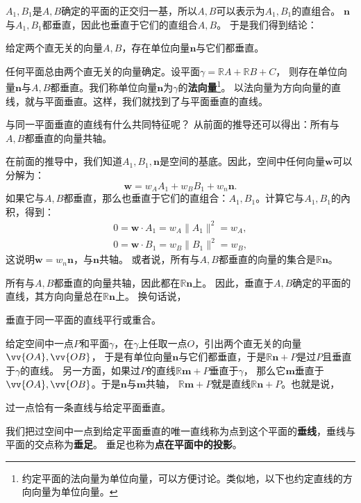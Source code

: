 \documentclass[12pt,UTF8,fontset=none]{ctexbook}
\begin{document}
$A_1,B_1$是$A,B$确定的平面的正交归一基，所以$A,B$可以表示为$A_1,B_1$的直组合。
$\mathbf{n}$与$A_1,B_1$都垂直，因此也垂直于它们的直组合$A,B$。
于是我们得到结论：
\begin{tm}\label{tm:1-3-30}
    给定两个直无关的向量$A,B$，存在单位向量$\mathbf{n}$与它们都垂直。
\end{tm}
任何平面总由两个直无关的向量确定。设平面$\gamma = \mathbb{R}A + \mathbb{R}B + C$，
则存在单位向量$\mathbf{n}$与$A,B$都垂直。我们称单位向量$\mathbf{n}$为$\gamma$的\textbf{法向量}\footnote{约定平面的法向量为单位向量，可以方便讨论。类似地，以下也约定直线的方向向量为单位向量。}。
以法向量为方向向量的直线，就与平面垂直。这样，我们就找到了与平面垂直的直线。

与同一平面垂直的直线有什么共同特征呢？
从前面的推导还可以得出：所有与$A,B$都垂直的向量共轴。

在前面的推导中，我们知道$A_1,B_1,\mathbf{n}$是空间的基底。因此，空间中任何向量$\mathbf{w}$可以分解为：
$$ \mathbf{w} = w_A A_1 + w_B B_1 + w_n \mathbf{n}. $$
如果它与$A,B$都垂直，那么也垂直于它们的直组合：$A_1,B_1$。计算它与$A_1,B_1$的內积，得到：
\begin{align*}
    0 = \mathbf{w}\cdot A_1  = w_A\|A_1\|^2 = w_A,  \\
    0 = \mathbf{w}\cdot B_1  = w_B\|B_1\|^2 = w_B,  
\end{align*}
这说明$\mathbf{w} = w_n \mathbf{n}$，与$\mathbf{n}$共轴。
或者说，所有与$A,B$都垂直的向量的集合是$\mathbb{R}\mathbf{n}$。

所有与$A,B$都垂直的向量共轴，因此都在$\mathbb{R}\mathbf{n}$上。
因此，垂直于$A,B$确定的平面的直线，其方向向量总在$\mathbb{R}\mathbf{n}$上。
换句话说，
\begin{tm}\label{tm:1-3-40}
    垂直于同一平面的直线平行或重合。
\end{tm}
给定空间中一点$P$和平面$\gamma$，在$\gamma$上任取一点$O$，引出两个直无关的向量$\vv{OA},\vv{OB}$，
于是有单位向量$\mathbf{n}$与它们都垂直，于是$\mathbb{R}\mathbf{n} + P$是过$P$且垂直于$\gamma$的直线。
另一方面，如果过$P$的直线$\mathbb{R}\mathbf{m} + P$垂直于$\gamma$，
那么它$\mathbf{m}$垂直于$\vv{OA},\vv{OB}$。于是$\mathbf{n}$与$\mathbf{m}$共轴，
$\mathbb{R}\mathbf{m} + P$就是直线$\mathbb{R}\mathbf{n} + P$。也就是说，
\begin{tm}\label{tm:1-3-50}
    过一点恰有一条直线与给定平面垂直。
\end{tm}
我们把过空间中一点到给定平面垂直的唯一直线称为点到这个平面的\textbf{垂线}，垂线与平面的交点称为\textbf{垂足}。
垂足也称为\textbf{点在平面中的投影}。
\end{document}
